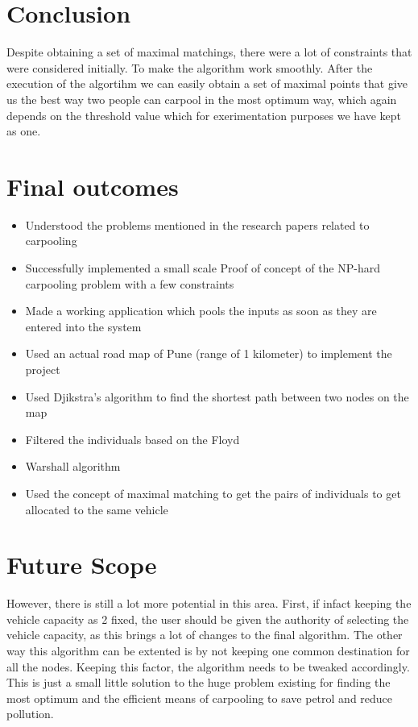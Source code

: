 \documentclass[main.tex]{subfiles}
\begin{document}
\section{Conclusion}
Despite obtaining a set of maximal matchings, there were a lot of constraints
that were considered initially. To make the algorithm work smoothly. After the
execution of the algortihm we can easily obtain a set of maximal points that
give us the best way two people can carpool in the most optimum way, which again
depends on the threshold value which for exerimentation purposes we have kept as
one.

\section{Final outcomes}
\begin{itemize}
  \item  Understood the problems mentioned in the research papers related to
    carpooling
  \item  Successfully implemented a small scale Proof of concept of the
    NP-hard carpooling problem with a few constraints
  \item  Made a working application which pools the inputs as soon as they are
    entered into the system
  \item  Used an actual road map of Pune (range of 1 kilometer) to implement
    the project
  \item  Used Djikstra's algorithm to find the shortest path between two nodes
    on the map
  \item  Filtered the individuals based on the Floyd\item Warshall algorithm
  \item  Used the concept of maximal matching to get the pairs of individuals
    to get allocated to the same vehicle
\end{itemize}

\section{Future Scope}
However, there is still a lot more potential in this area.  First, if infact
keeping the vehicle capacity as 2 fixed, the user should be given the authority
of selecting the vehicle capacity, as this brings a lot of changes to the final
algorithm.  The other way this algorithm can be extented is by not keeping one
common destination for all the nodes. Keeping this factor, the algorithm needs
to be tweaked accordingly.  This is just a small little solution to the huge
problem existing for finding the most optimum and the efficient means of
carpooling to save petrol and reduce pollution.
\end{document}
